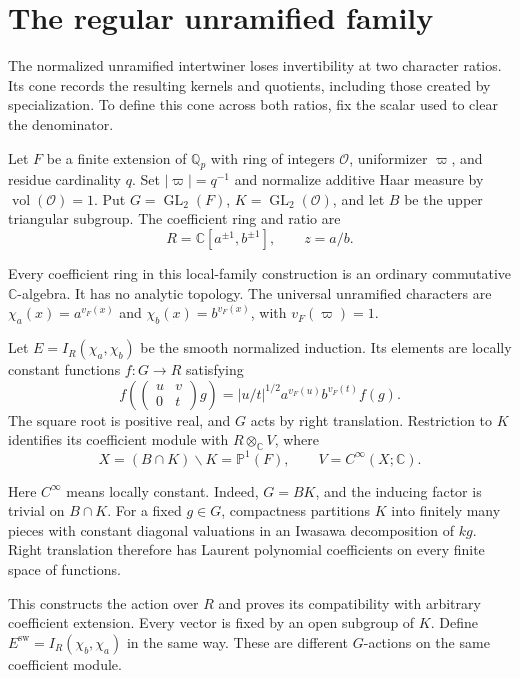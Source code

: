\section{The regular unramified family}

The normalized unramified intertwiner loses invertibility at two character ratios.
Its cone records the resulting kernels and quotients, including those created by specialization.
To define this cone across both ratios, fix the scalar used to clear the denominator.

Let $F$ be a finite extension of $\mathbb Q_p$ with ring of integers $\mathcal O$,
uniformizer $\varpi$, and residue cardinality $q$.
Set $|\varpi|=q^{-1}$ and normalize additive Haar measure by
$\operatorname{vol}(\mathcal O)=1$.
Put $G=\operatorname{GL}_2(F)$, $K=\operatorname{GL}_2(\mathcal O)$,
and let $B$ be the upper triangular subgroup.
The coefficient ring and ratio are
\[
 R=\mathbb C[a^{\pm1},b^{\pm1}],\qquad z=a/b.
\]

Every coefficient ring in this local-family construction is an ordinary commutative $\mathbb C$-algebra.
It has no analytic topology.
The universal unramified characters are
$\chi_a(x)=a^{v_F(x)}$ and $\chi_b(x)=b^{v_F(x)}$, with $v_F(\varpi)=1$.

Let $E=I_R(\chi_a,\chi_b)$ be the smooth normalized induction.
Its elements are locally constant functions $f:G\to R$ satisfying
\[
 f\left(\begin{pmatrix}u&v\\0&t\end{pmatrix}g\right)
   =|u/t|^{1/2}a^{v_F(u)}b^{v_F(t)}f(g).
\]
The square root is positive real, and $G$ acts by right translation.
Restriction to $K$ identifies its coefficient module with $R\otimes_\mathbb C V$, where
\[
 X=(B\cap K)\backslash K=\mathbb P^1(F),\qquad
 V=C^\infty(X;\mathbb C).
\]

Here $C^\infty$ means locally constant.
Indeed, $G=BK$, and the inducing factor is trivial on $B\cap K$.
For a fixed $g\in G$, compactness partitions $K$ into finitely many pieces
with constant diagonal valuations in an Iwasawa decomposition of $kg$.
Right translation therefore has Laurent polynomial coefficients on every finite space of functions.

This constructs the action over $R$ and proves its compatibility with arbitrary coefficient extension.
Every vector is fixed by an open subgroup of $K$.
Define $E^\mathrm{sw}=I_R(\chi_b,\chi_a)$ in the same way.
These are different $G$-actions on the same coefficient module.

